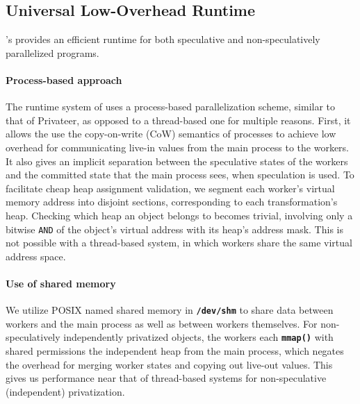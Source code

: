 \subsection{Universal Low-Overhead Runtime}

\namensp's provides an efficient runtime
for both speculative and non-speculatively parallelized programs.

\paragraph{Process-based approach}
The runtime system of \name uses a process-based parallelization scheme,
similar to that of Privateer, as opposed to a thread-based one for multiple
reasons. First, it allows the use the copy-on-write (CoW) semantics of
processes to achieve low overhead for communicating live-in values from the
main process to the workers.
It also gives an implicit separation between the speculative states of the
workers and the committed state that the main process sees, when
speculation is used. To facilitate cheap heap assignment validation, we
segment each worker's virtual memory address into disjoint sections,
corresponding to each transformation's heap. Checking which heap an object
belongs to becomes trivial, involving only a bitwise \texttt{AND} of the
object's virtual address with its heap's address mask.
This is not possible
with a thread-based system, in which workers share the same virtual address
space.

\paragraph{Use of shared memory}
We utilize POSIX named shared memory in \texttt{\textbf{/dev/shm}} to share
data between workers and the main process as well as between workers
themselves.
For non-speculatively independently privatized objects, the workers
each \texttt{\textbf{mmap()}} with shared permissions the independent heap
from the main process, which negates the overhead for merging worker states
and copying out live-out values. This gives us performance near that of
thread-based systems for non-speculative (independent) privatization.

